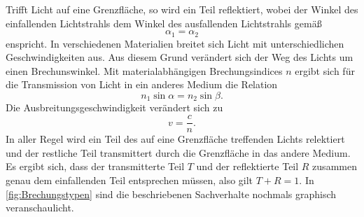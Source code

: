 Trifft Licht auf eine Grenzfläche, so wird ein Teil reflektiert, wobei der Winkel des einfallenden Lichtstrahls dem Winkel
des ausfallenden Lichtstrahls gemäß
\begin{equation}
    \alpha_1 = \alpha_2 \label{eq:Reflexion}
\end{equation}
enspricht.
In verschiedenen Materialien breitet sich Licht mit unterschiedlichen Geschwindigkeiten aus. Aus diesem Grund verändert sich
der Weg des Lichts um einen Brechunswinkel. Mit materialabhängigen Brechungsindices $n$ ergibt sich für die Transmission
von Licht in ein anderes Medium die Relation
\begin{equation}
    n_1\sin\alpha = n_2\sin\beta. \label{eq:Brechung}
\end{equation}
Die Ausbreitungsgeschwindigkeit verändert sich zu
\begin{equation}
    v = \frac{c}{n}. \label{eq:Ausbreitungsgeschwindigkeit}
\end{equation}
In aller Regel wird ein Teil des auf eine Grenzfläche treffenden Lichts relektiert und der restliche Teil transmittert durch die 
Grenzfläche in das andere Medium. Es ergibt sich, dass der transmitterte Teil $T$ und der reflektierte Teil $R$ zusammen genau
dem einfallenden Teil entsprechen müssen, also gilt $T + R = 1$.
In \autoref{fig:Brechungstypen} sind die beschriebenen Sachverhalte nochmals graphisch veranschaulicht.
